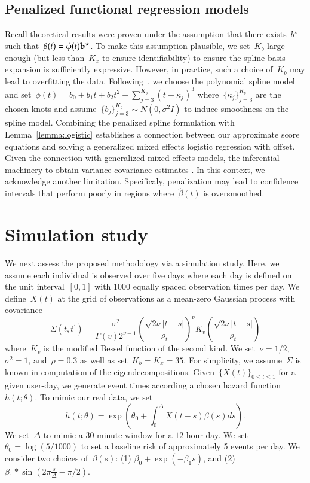 \documentclass[12pt]{amsart}
\begin{document}
\subsection{Penalized functional regression models}

Recall theoretical results were proven under the assumption that there exists~$b^\star$ such that~$\beta(t) = \phi(t) {\bf b}^\star$. To make this assumption plausible, we set~$K_b$ large enough (but less than~$K_x$ to ensure identifiability) to ensure the spline basis expansion is sufficiently expressive. However, in practice, such a choice of~$K_b$ may lead to overfitting the data. Following~\cite{Goldsmith2011}, we choose the polynomial spline model and set~$\phi(t) = b_0 + b_1 t + b_2 t^2 + \sum_{j=3}^{K_b} (t-\kappa_j)^3$ where~$\{ \kappa_j \}_{j=3}^{K_b}$ are the chosen knots and assume~$\{ b_j \}_{j=3}^{K_b} \sim N(0, \sigma^2 I)$ to induce smoothness on the spline model.  Combining the penalized spline formulation with Lemma~\ref{lemma:logistic} establishes a connection between our approximate score equations and solving a generalized mixed effects logistic regression with offset.  Given the connection with generalized mixed effects models, the inferential machinery to obtain variance-covariance estimates . In this context, we acknowledge another limitation.  Specificaly, penalization may lead to confidence intervals that perform poorly in regions where~$\hat \beta(t)$ is oversmoothed.



\section{Simulation study} \label{section:simstudy}

We next assess the proposed methodology via a simulation study. Here, we assume each individual is observed over five days where each day is defined on the unit interval~$[0,1]$ with $1000$ equally spaced observation times per day. We define~$X(t)$ at the grid of observations as a mean-zero Gaussian process with covariance
\[
  \Sigma (t, t^\prime) =
  \frac{\sigma^2}{\Gamma (v) 2^{\nu-1}}
  \left( \frac{\sqrt{2 \nu} |t-s|}{\rho_t} \right)^{\nu}
  K_v \left( \frac{\sqrt{2 \nu} |t-s|}{\rho_t} \right)
\]
where~$K_v$ is the modified Bessel function of the second kind.  We set~$\nu = 1/2$, $\sigma^2 = 1$, and~$\rho = 0.3$ as well as set~$K_b = K_x = 35$.  For simplicity, we assume~$\Sigma$ is known in computation of the eigendecompositions. Given~$\{ X(t) \}_{0 \leq t \leq 1}$ for a given user-day, we generate event times according a chosen hazard function~$h (t; \theta)$.  To mimic our real data, we set
\[
h(t; \theta) = \exp \left( \theta_0 + \int_{0}^{\Delta} X(t-s) \beta(s) ds \right).
\]
We set~$\Delta$ to mimic a 30-minute window for a $12$-hour day.  We set~$\theta_0 = \log(5/1000)$ to set a baseline risk of approximately 5 events per day. We consider two choices of~$\beta(s)$: (1) $\beta_0 + \exp(- \beta_1 s) $, and (2) $\beta_1  * \sin \left( 2 \pi \frac{s}{\Delta} - \pi/2 \right)$.
\end{document}
